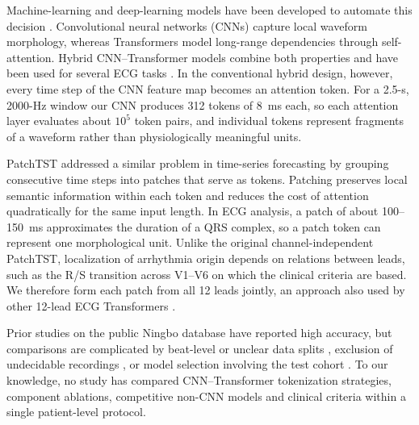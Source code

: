 \documentclass[preprint,12pt]{elsarticle}
\begin{document}
Machine-learning and deep-learning models have been developed to automate this decision \cite{zheng2022origins,zhao2022features,nakasone2024dualrhythm,shahsavari2024origin,kujime2024semantic,talebzadeh2025outflow,baek2026origin,miyamae2026paired}. Convolutional neural networks (CNNs) capture local waveform morphology, whereas Transformers \cite{vaswani2017attention} model long-range dependencies through self-attention. Hybrid CNN--Transformer models combine both properties and have been used for several ECG tasks \cite{zou2023dwtcnntrn,kim2025stockwell,tang2024hierarchical}. In the conventional hybrid design, however, every time step of the CNN feature map becomes an attention token. For a 2.5-s, 2000-Hz window our CNN produces 312 tokens of 8~ms each, so each attention layer evaluates about $10^5$ token pairs, and individual tokens represent fragments of a waveform rather than physiologically meaningful units.

PatchTST \cite{nie2023patchtst} addressed a similar problem in time-series forecasting by grouping consecutive time steps into patches that serve as tokens. Patching preserves local semantic information within each token and reduces the cost of attention quadratically for the same input length. In ECG analysis, a patch of about 100--150~ms approximates the duration of a QRS complex, so a patch token can represent one morphological unit. Unlike the original channel-independent PatchTST, localization of arrhythmia origin depends on relations between leads, such as the R/S transition across V1--V6 on which the clinical criteria are based. We therefore form each patch from all 12 leads jointly, an approach also used by other 12-lead ECG Transformers \cite{cheng2023mswtransformer}.

Prior studies on the public Ningbo database \cite{zheng2020dataset} have reported high accuracy, but comparisons are complicated by beat-level or unclear data splits \cite{talebzadeh2025outflow}, exclusion of undecidable recordings \cite{kujime2024semantic}, or model selection involving the test cohort \cite{zheng2022origins}. To our knowledge, no study has compared CNN--Transformer tokenization strategies, component ablations, competitive non-CNN models and clinical criteria within a single patient-level protocol.
\end{document}
